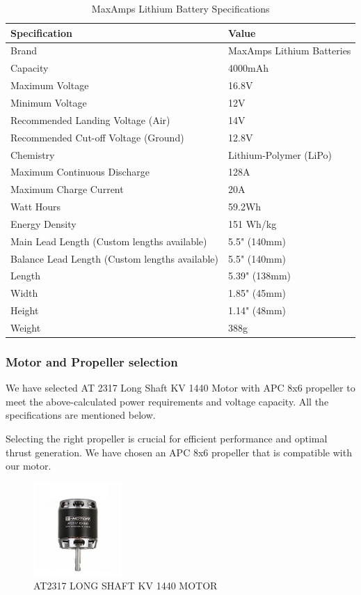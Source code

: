 \documentclass[12 pt]{article}
\begin{document}
\begin{table}[h]
    \centering
    \caption{MaxAmps Lithium Battery Specifications}
    \begin{tabular}{|l|l|}
    \hline
    \textbf{Specification} & \textbf{Value} \\ \hline
    Brand & MaxAmps Lithium Batteries \\
    Capacity & 4000mAh \\
    Maximum Voltage & 16.8V \\
    Minimum Voltage & 12V \\
    Recommended Landing Voltage (Air) & 14V \\
    Recommended Cut-off Voltage (Ground) & 12.8V \\
    Chemistry & Lithium-Polymer (LiPo) \\
    Maximum Continuous Discharge & 128A \\
    Maximum Charge Current & 20A \\
    Watt Hours & 59.2Wh \\
    Energy Density & 151 Wh/kg \\
    Main Lead Length (Custom lengths available) & 5.5" (140mm) \\
    Balance Lead Length (Custom lengths available) & 5.5" (140mm) \\
    Length & 5.39" (138mm) \\
    Width & 1.85" (45mm) \\
    Height & 1.14" (48mm) \\
    Weight & 388g \\ \hline
    \end{tabular}
\end{table}

\subsubsection{{Motor and Propeller selection}}

We have selected AT 2317 Long Shaft KV 1440 Motor with APC 8x6 propeller to meet the above-calculated power requirements and voltage capacity. All the specifications are mentioned below.

Selecting the right propeller is crucial for efficient performance and optimal thrust generation. We have chosen an APC 8x6 propeller that is compatible with our motor.

\begin{figure}[h]
    \centering
    \includegraphics[width=0.3\textwidth]{motorr.jpg}
    \caption{AT2317 LONG SHAFT KV 1440 MOTOR}
    \label{fig:motor}
\end{figure}
\end{document}
